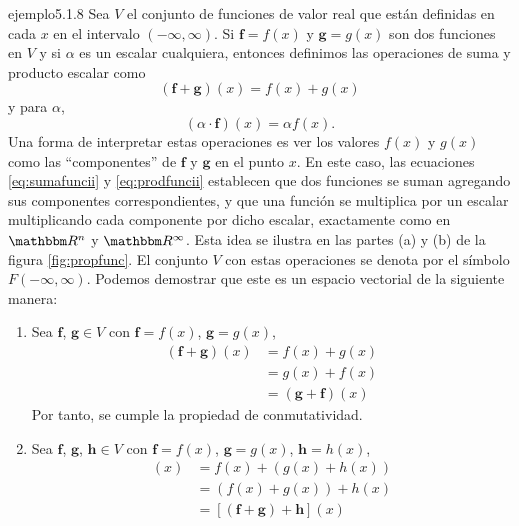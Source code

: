 \begin{examplebox}{}{ejemplo5.1.8}
    Sea $V$ el conjunto de funciones de valor real que están definidas en cada $x$ en el intervalo $(-\infty, \infty)$. Si $\mathbf{f} = f(x)$ y $\mathbf{g} = g(x)$ son dos funciones en $V$ y si $\alpha$ es un escalar cualquiera, entonces definimos las operaciones de suma y producto escalar como
    \begin{equation}
        (\mathbf{f} + \mathbf{g})(x) = f(x) + g(x) \label{eq:sumafuncii}
    \end{equation}
    y para $\alpha$,
    \begin{equation}
        (\alpha \cdot \mathbf{f})(x) = \alpha f(x). \label{eq:prodfuncii}
    \end{equation}
    Una forma de interpretar estas operaciones es ver los valores $f(x)$ y $g(x)$ como las “componentes” de $\mathbf{f}$ y $\mathbf{g}$ en el punto $x$. En este caso, las ecuaciones \eqref{eq:sumafuncii} y \eqref{eq:prodfuncii} establecen que dos funciones se suman agregando sus componentes correspondientes, y que una función se multiplica por un escalar multiplicando cada componente por dicho escalar, exactamente como en $\RR[n]$ y $\RR[\infty]$. Esta idea se ilustra en las partes (a) y (b) de la figura \ref{fig:propfunc}. El conjunto $V$ con estas operaciones se denota por el símbolo $F(-\infty, \infty)$. Podemos demostrar que este es un espacio vectorial de la siguiente manera:
    \begin{enumerate}[label=\roman*), topsep=6pt, itemsep=0pt]
        \item Sea $\mathbf{f}$, $\mathbf{g} \in V$ con $\mathbf{f} = f(x)$, $\mathbf{g} = g(x)$,
        \begin{align*}
            (\mathbf{f} + \mathbf{g})(x) & = f(x) + g(x) \\
            & = g(x) + f(x) \\
            & = (\mathbf{g} + \mathbf{f})(x)
        \end{align*}
        Por tanto, se cumple la propiedad de conmutatividad.
        \item Sea $\mathbf{f}$, $\mathbf{g}$, $\mathbf{h} \in V$ con $\mathbf{f} = f(x)$, $\mathbf{g} = g(x)$, $\mathbf{h} = h(x)$,
        \begin{align*}
            [\mathbf{f} + (\mathbf{g} + \mathbf{h})](x) & = f(x) + (g(x) + h(x)) \\
            & = (f(x) + g(x)) + h(x) \\
            & = [(\mathbf{f} + \mathbf{g}) + \mathbf{h}](x)

\end{align*}
\end{enumerate}
\end{examplebox}
